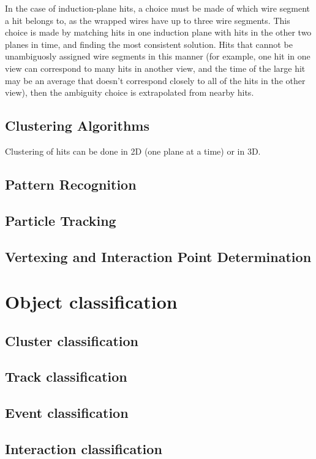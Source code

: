In the case of induction-plane hits, a choice must be made of which
wire segment a hit belongs to, as the wrapped wires have up to three wire segments.  This choice is made by
matching hits in one induction plane with hits in the other two planes in time, and finding the most consistent
solution.  Hits that cannot be unambiguosly assigned wire segments in this manner (for example, one hit in one
view can correspond to many hits in another view, and the time of the large hit may be an average that doesn't
correspond closely to all of the hits in the other view), then the ambiguity choice is extrapolated from nearby
hits.

\subsection{Clustering Algorithms}

Clustering of hits can be done in 2D (one plane at a time) or in 3D.

\subsection{Pattern Recognition}
\subsection{Particle Tracking}
\subsection{Vertexing and Interaction Point Determination}

\section{Object classification}
\subsection{Cluster classification}
\subsection{Track classification}
\subsection{Event classification}
\subsection{Interaction classification}


